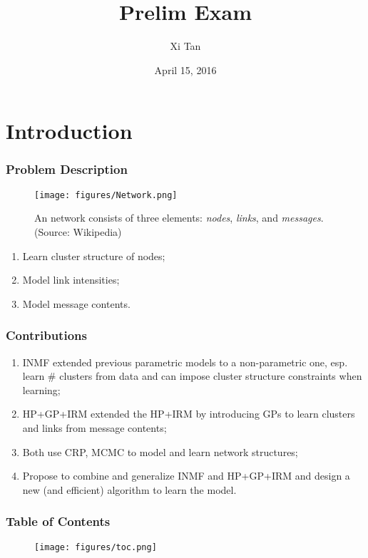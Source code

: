 \documentclass{beamer}
\begin{document}
\title{Prelim Exam}
\author{Xi Tan}
\date{April 15, 2016}
\maketitle

\section{Introduction}
\begin{frame}
\frametitle{Problem Description}
\begin{figure}[c]
  \texttt{[image: figures/Network.png]}
  \caption{An network consists of three elements: {\em{nodes}}, {\em{links}}, and {\em{messages}}. (Source: Wikipedia)}
\end{figure}

\begin{enumerate}
	\item Learn cluster structure of nodes;
    \item Model link intensities; 
    \item Model message contents.
\end{enumerate}

\end{frame}

\begin{frame}
\frametitle{Contributions}
\begin{enumerate}
	\item INMF extended previous parametric models to a non-parametric one, esp. learn \# clusters from data and can impose cluster structure constraints when learning;
    \item HP+GP+IRM extended the HP+IRM by introducing GPs to learn clusters and links from message contents;
    \item Both use CRP, MCMC to model and learn network structures;
    \item Propose to combine and generalize INMF and HP+GP+IRM and design a new (and efficient) algorithm to learn the model.
\end{enumerate}

\end{frame}

\begin{frame}
\frametitle{Table of Contents}
\begin{figure}[c]
  \texttt{[image: figures/toc.png]}  
\end{figure}

\end{frame}
\end{document}
